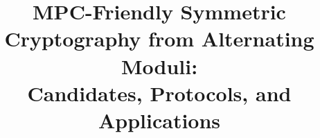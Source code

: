 \documentclass[11pt]{article}
\begin{document}
\title{MPC-Friendly Symmetric Cryptography from Alternating Moduli: \\Candidates,  Protocols, and Applications }
\author{}
\date{}

\maketitle


\end{document}
